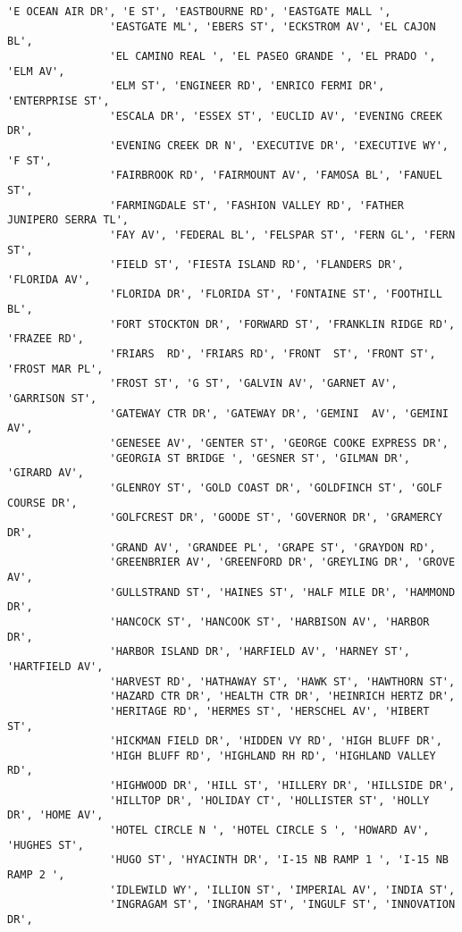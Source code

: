 \documentclass[11pt]{article}
\begin{document}
\begin{Verbatim}[commandchars=\\\{\}]
                'E OCEAN AIR DR', 'E ST', 'EASTBOURNE RD', 'EASTGATE MALL ',
                'EASTGATE ML', 'EBERS ST', 'ECKSTROM AV', 'EL CAJON BL',
                'EL CAMINO REAL ', 'EL PASEO GRANDE ', 'EL PRADO ', 'ELM AV',
                'ELM ST', 'ENGINEER RD', 'ENRICO FERMI DR', 'ENTERPRISE ST',
                'ESCALA DR', 'ESSEX ST', 'EUCLID AV', 'EVENING CREEK DR',
                'EVENING CREEK DR N', 'EXECUTIVE DR', 'EXECUTIVE WY', 'F ST',
                'FAIRBROOK RD', 'FAIRMOUNT AV', 'FAMOSA BL', 'FANUEL ST',
                'FARMINGDALE ST', 'FASHION VALLEY RD', 'FATHER JUNIPERO SERRA TL',
                'FAY AV', 'FEDERAL BL', 'FELSPAR ST', 'FERN GL', 'FERN ST',
                'FIELD ST', 'FIESTA ISLAND RD', 'FLANDERS DR', 'FLORIDA AV',
                'FLORIDA DR', 'FLORIDA ST', 'FONTAINE ST', 'FOOTHILL BL',
                'FORT STOCKTON DR', 'FORWARD ST', 'FRANKLIN RIDGE RD', 'FRAZEE RD',
                'FRIARS  RD', 'FRIARS RD', 'FRONT  ST', 'FRONT ST', 'FROST MAR PL',
                'FROST ST', 'G ST', 'GALVIN AV', 'GARNET AV', 'GARRISON ST',
                'GATEWAY CTR DR', 'GATEWAY DR', 'GEMINI  AV', 'GEMINI AV',
                'GENESEE AV', 'GENTER ST', 'GEORGE COOKE EXPRESS DR',
                'GEORGIA ST BRIDGE ', 'GESNER ST', 'GILMAN DR', 'GIRARD AV',
                'GLENROY ST', 'GOLD COAST DR', 'GOLDFINCH ST', 'GOLF COURSE DR',
                'GOLFCREST DR', 'GOODE ST', 'GOVERNOR DR', 'GRAMERCY DR',
                'GRAND AV', 'GRANDEE PL', 'GRAPE ST', 'GRAYDON RD',
                'GREENBRIER AV', 'GREENFORD DR', 'GREYLING DR', 'GROVE AV',
                'GULLSTRAND ST', 'HAINES ST', 'HALF MILE DR', 'HAMMOND DR',
                'HANCOCK ST', 'HANCOOK ST', 'HARBISON AV', 'HARBOR DR',
                'HARBOR ISLAND DR', 'HARFIELD AV', 'HARNEY ST', 'HARTFIELD AV',
                'HARVEST RD', 'HATHAWAY ST', 'HAWK ST', 'HAWTHORN ST',
                'HAZARD CTR DR', 'HEALTH CTR DR', 'HEINRICH HERTZ DR',
                'HERITAGE RD', 'HERMES ST', 'HERSCHEL AV', 'HIBERT ST',
                'HICKMAN FIELD DR', 'HIDDEN VY RD', 'HIGH BLUFF DR',
                'HIGH BLUFF RD', 'HIGHLAND RH RD', 'HIGHLAND VALLEY RD',
                'HIGHWOOD DR', 'HILL ST', 'HILLERY DR', 'HILLSIDE DR',
                'HILLTOP DR', 'HOLIDAY CT', 'HOLLISTER ST', 'HOLLY DR', 'HOME AV',
                'HOTEL CIRCLE N ', 'HOTEL CIRCLE S ', 'HOWARD AV', 'HUGHES ST',
                'HUGO ST', 'HYACINTH DR', 'I-15 NB RAMP 1 ', 'I-15 NB RAMP 2 ',
                'IDLEWILD WY', 'ILLION ST', 'IMPERIAL AV', 'INDIA ST',
                'INGRAGAM ST', 'INGRAHAM ST', 'INGULF ST', 'INNOVATION DR',

\end{Verbatim}
\end{document}
